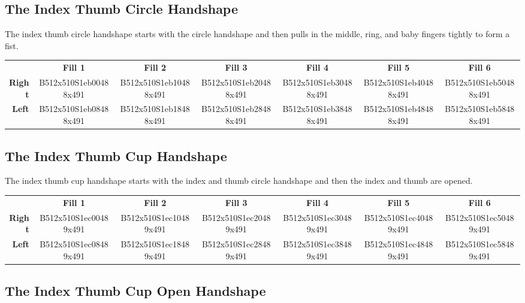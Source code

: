 \documentclass{article}
\begin{document}
\subsection{The Index Thumb Circle Handshape}

The index thumb circle handshape starts with the circle handshape and then pulls in the middle, ring, and baby fingers tightly to form a fist.

\begin{center}
\begin{tabular}{r*{6}{c}}
&\textbf{Fill 1}&\textbf{Fill 2}&\textbf{Fill 3}&\textbf{Fill 4}&\textbf{Fill 5}&\textbf{Fill 6}\\
\textbf{Right}&
B512x510S1eb00488x491&
B512x510S1eb10488x491&
B512x510S1eb20488x491&
B512x510S1eb30488x491&
B512x510S1eb40488x491&
B512x510S1eb50488x491\\
\textbf{Left}&
B512x510S1eb08488x491&
B512x510S1eb18488x491&
B512x510S1eb28488x491&
B512x510S1eb38488x491&
B512x510S1eb48488x491&
B512x510S1eb58488x491\\
\end{tabular}
\end{center}

\subsection{The Index Thumb Cup Handshape}

The index thumb cup handshape starts with the index and thumb circle handshape and then the index and thumb are opened.

\begin{center}
\begin{tabular}{r*{6}{c}}
&\textbf{Fill 1}&\textbf{Fill 2}&\textbf{Fill 3}&\textbf{Fill 4}&\textbf{Fill 5}&\textbf{Fill 6}\\
\textbf{Right}&
B512x510S1ec00489x491&
B512x510S1ec10489x491&
B512x510S1ec20489x491&
B512x510S1ec30489x491&
B512x510S1ec40489x491&
B512x510S1ec50489x491\\
\textbf{Left}&
B512x510S1ec08489x491&
B512x510S1ec18489x491&
B512x510S1ec28489x491&
B512x510S1ec38489x491&
B512x510S1ec48489x491&
B512x510S1ec58489x491\\
\end{tabular}
\end{center}

\subsection{The Index Thumb Cup Open Handshape}
\end{document}
